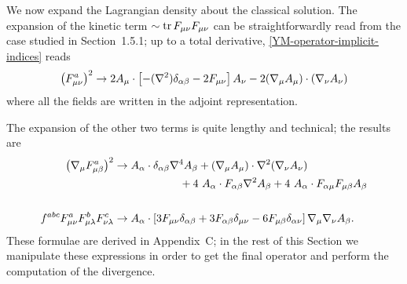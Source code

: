 We now expand the Lagrangian density about the classical solution. 
The expansion of the  kinetic term $\sim \operatorname{tr} F_{\mu\nu} F_{\mu\nu}$ can be straightforwardly read from the \ym{} case studied in Section~1.5.1; up to a total derivative, \eqref{YM-operator-implicit-indices} reads %
\begin{equation}
\label{LW-ym-expansion}
\left( F^a_{\mu\nu} \right)^2
\rightarrow
2  A_\mu \cdot   \left[
  	- ( { \mathcal{\nabla} }^2 ) \delta_{ \alpha \beta }  
	- 2 F_{ \mu\nu }
  	\right]
 A_\nu 
-
2  ({ \mathcal{\nabla} }_\mu A_\mu ) \cdot ({ \mathcal{\nabla} }_\nu A_\nu) 
\end{equation}
where all the fields are written in the adjoint representation.



The expansion of the other two terms is quite lengthy and technical; the results are
\begin{align}
\label{LW-DF2-expansion}
\left({ \mathcal{\nabla} }_\mu F_{\mu \beta}^a \right)^2  
& \rightarrow 
 	A_\alpha \cdot \delta_{\alpha \beta} { \mathcal{\nabla} }^4 A_\beta
 	+ ({ \mathcal{\nabla} }_\mu A_\mu) \cdot { \mathcal{\nabla} }^2 ({ \mathcal{\nabla} }_\nu A_\nu )  \\\nonumber
& \hspace{6em}
 	+ 4\ A_\alpha \cdot F_{ \alpha \beta} { \mathcal{\nabla} }^2 A_\beta
 	+ 4\ A_\alpha \cdot F_{ \alpha \mu} F_{\mu \beta } A_\beta
\\\nonumber
\\
\label{LW-FFF-expansion}
f^{abc} F_{\mu\nu}^a F_{\mu\lambda}^b F_{\nu\lambda}^c
& 
\rightarrow
A_{\alpha} \cdot
	\left[
		3 F_{ \mu \nu } \delta_{ \alpha \beta }  
		+  3 F_{ \alpha \beta} \delta_{ \mu \nu } 
		- 6 F_{ \mu \beta }\delta_{ \alpha \nu } 
	\right]
	 { \mathcal{\nabla} }_{ \mu } { \mathcal{\nabla} }_{ \nu } A_{\beta}.
\end{align}
These formulae are derived in Appendix~C; in the rest of this Section we manipulate these expressions in order to get the final operator and perform the computation of the divergence.



